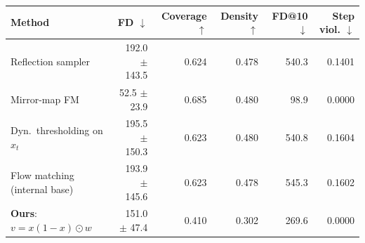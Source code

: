 \begin{tabular}{lrrrrr}
\toprule
Method & FD $\downarrow$ & Coverage $\uparrow$ & Density $\uparrow$ & FD@10 $\downarrow$ & Step viol. $\downarrow$ \\
\midrule
Reflection sampler~\citep{lou2023reflected} & 192.0 $\pm$ 143.5 & 0.624 & 0.478 & 540.3 & 0.1401 \\
Mirror-map FM~\citep{liu2023mirror} & 52.5 $\pm$ 23.9 & 0.685 & 0.480 & 98.9 & 0.0000 \\
Dyn.\ thresholding on $x_t$~\citep{saharia2022imagen} & 195.5 $\pm$ 150.3 & 0.623 & 0.480 & 540.8 & 0.1604 \\
\midrule
Flow matching (internal base) & 193.9 $\pm$ 145.6 & 0.623 & 0.478 & 545.3 & 0.1602 \\
\textbf{Ours}: $v = x(1-x)\odot w$ & 151.0 $\pm$ 47.4 & 0.410 & 0.302 & 269.6 & 0.0000 \\
\bottomrule
\end{tabular}
